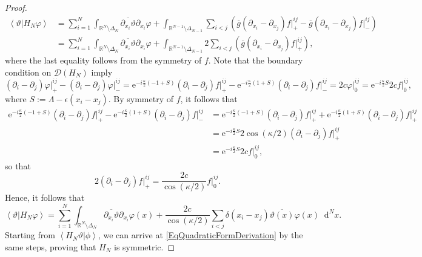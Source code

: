 \documentclass[a4paper,11pt]{article}
\newcommand{\euler}[1]{\text{e}^{#1}}
\renewcommand{\braket}[1]{\left\langle#1\right\rangle}
\newcommand*\diff{\mathop{}\!\mathrm{d}}
\newcommand{\R}{\mathbb{R}}
\numberwithin{equation}{section}
\begin{document}
\begin{proof}
		\begin{equation}
			\begin{aligned}
				\braket{\vartheta\vert H_N \varphi}&=\sum_{i=1}^{N}\int_{\R^N\setminus\Delta_N}\overline{\partial_{x_i}\vartheta}\partial_{x_i}\varphi+\int_{\R^{N-1}\setminus\Delta_{N-1}}\sum_{i< j}\left(\overline{g}(\partial_{x_i}-\partial_{x_j})f\vert^{ij}_+-\overline{g}(\partial_{x_i}-\partial_{x_j})f\vert^{ij}_-\right)\\
				&=\sum_{i=1}^{N}\int_{\R^N\setminus\Delta_N}\overline{\partial_{x_i}\vartheta}\partial_{x_i}\varphi+\int_{\R^{N-1}\setminus\Delta_{N-1}}2\sum_{i< j}\left(\overline{g}(\partial_{x_i}-\partial_{x_j})f\vert^{ij}_+\right),
			\end{aligned}
		\end{equation}
		where the last equality follows from the symmetry of $f$. Note that the boundary condition on $ \mathcal{D}(H_N) $ imply \begin{equation}
			(\partial_i-\partial_j)\varphi\rvert^{ij}_+-(\partial_i-\partial_j)\varphi\rvert^{ij}_-=\euler{-i\frac{\kappa}{2}\left(-1+S\right)}(\partial_i-\partial_j)f\rvert^{ij}_+-\euler{-i\frac{\kappa}{2}\left(1+S\right)}(\partial_i-\partial_j)f\rvert^{ij}_-=2c \varphi\rvert^{ij}_0=\euler{-i\frac{\kappa}{2}S}2c f\rvert^{ij}_0,
		\end{equation}
		where $ S:=\Lambda-\epsilon(x_i-x_j) $. By symmetry of $ f $, it follows that \begin{equation}
			\begin{aligned}
				\euler{-i\frac{\kappa}{2}\left(-1+S\right)}(\partial_i-\partial_j)f\rvert^{ij}_+-\euler{-i\frac{\kappa}{2}\left(1+S\right)}(\partial_i-\partial_j)f\rvert^{ij}_-
				&=\euler{-i\frac{\kappa}{2}\left(-1+S\right)}(\partial_i-\partial_j)f\rvert^{ij}_++\euler{-i\frac{\kappa}{2}\left(1+S\right)}(\partial_i-\partial_j)f\rvert^{ij}_+\\
				&=\euler{-i\frac{\kappa}{2}S}2\cos(\kappa/2)(\partial_i-\partial_j)f\rvert^{ij}_+\\
				&=\euler{-i\frac{\kappa}{2}S}2c f\rvert^{ij}_0,
			\end{aligned}
		\end{equation}
		so that \begin{equation}
			2(\partial_i-\partial_j)f\rvert^{ij}_+=\frac{2c}{\cos(\kappa/2)}f\rvert^{ij}_0. 
		\end{equation}
		Hence, it follows that \begin{equation}\label{EqQuadraticFormDerivation}
			\braket{\vartheta\vert H_N \varphi}=\sum_{i=1}^{N}\int_{{\R^N\setminus\Delta_N}}\overline{\partial_{x_i}\vartheta} \partial_{x_i}\varphi(x)+\frac{2c}{\cos(\kappa/2)}\sum_{i<j} \delta(x_i-x_j)\overline{\vartheta(x)}\varphi(x)\diff^{N}x.
		\end{equation}
		Starting from $ \braket{H_N\vartheta\vert \phi} $, we can arrive at \eqref{EqQuadraticFormDerivation} by the same steps, proving that $ H_N $ is symmetric. 	
	\end{proof}
\end{document}
